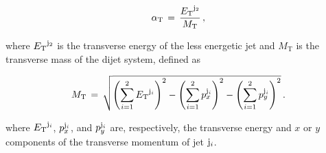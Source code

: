 %
%

\begin{equation}
\label{eq:alphat}
\alpha_{\text{T}}\, =\, \frac{{E_{\text T}}^{{\rm j}_2}}{M_\text{T}} \, ,
\end{equation}

where ${E_{\text T}}^{\rm j_2}$ is the transverse energy of the less energetic
jet and $M_\text{T}$ is the transverse mass of the dijet system,
defined as

\begin{equation}
  \label{eq:mt}
  M_\text{T}\, = \,\sqrt{ \left( \sum_{i=1}^2 {E_{\text T}}^{{\rm j}_i}
    \right)^2 - \left( \sum_{i=1}^2 p_x^{{\rm j}_i} \right)^2 - \left(
      \sum_{i=1}^2 p_y^{{\rm j}_i} \right)^2} \, .
\end{equation}

where ${E_{\text T}}^{{\rm j}_i}$, $p_x^{{\rm j}_i}$, and $p_y^{{\rm j}_i}$ are,
respectively, the transverse energy and $x$ or $y$ components of the
transverse momentum of jet ${\rm j}_i$.

